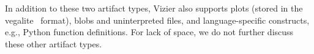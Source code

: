 In addition to these two artifact types, Vizier also supports plots (stored in the vegalite~ \cite{DBLP:journals/tvcg/SatyanarayanMWH17} format), blobs and uninterpreted files, and language-specific constructs, e.g., Python function definitions. For lack of space, we do not further  discuss these other artifact types.







